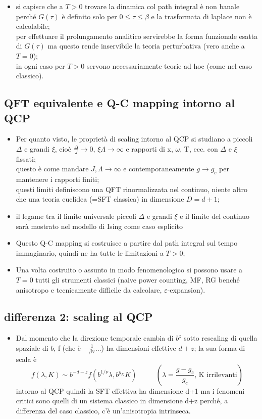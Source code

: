 \documentclass[a4paper,11pt]{article}
\newcommand{\csi}{\xi}
\newcommand{\ssubsection}[1]{\vspace{0.2cm} \subsection{#1}}
\begin{document}
\begin{itemize}
\begin{itemize}
		 \item si capisce che a $T>0$ trovare la dinamica col path integral è non banale perché $G(\tau)$ è definito solo per $0\leq \tau \leq \beta$ e la trasformata di laplace non è calcolabile; \\per effettuare il prolungamento analitico servirebbe la forma funzionale esatta di $G(\tau)$ ma questo rende inservibile la teoria perturbativa (vero anche a $T=0$); \\in ogni caso per $T>0$ servono necessariamente teorie ad hoc (come nel caso classico).
		\end{itemize}
\end{itemize}

\ssubsection{QFT equivalente e Q-C mapping intorno al QCP}
\begin{itemize}
 \item Per quanto visto, le proprietà di scaling intorno al QCP si studiano a piccoli $\Delta$ e grandi $\csi$, cioè $\frac{\Delta}{J}\to 0$, $\csi\Lambda\to\infty$ e rapporti di x, $\omega$, T, ecc. con $\Delta$ e $\csi$ fissati; \\questo è come mandare $J,\Lambda \to \infty$ e contemporaneamente $g\to g_c$ per mantenere i rapporti finiti; \\questi limiti definiscono una QFT rinormalizzata nel continuo, niente altro che una teoria euclidea (=SFT classica) in dimensione $D=d+1$;
 \item il legame tra il limite universale piccoli $\Delta$ e grandi $\csi$ e il limite del continuo sarà mostrato nel modello di Ising come caso esplicito
 \item Questo Q-C mapping si costruisce a partire dal path integral sul tempo immaginario, quindi ne ha tutte le limitazioni a $T>0$;
 \item Una volta costruito o assunto in modo fenomenologico si possono usare a $T=0$ tutti gli strumenti classici (naive power counting, MF, RG benché anisotropo e tecnicamente difficile da calcolare, $\varepsilon$-expansion).
\end{itemize}

\ssubsection{differenza 2: scaling al QCP}
\begin{itemize}
 \item Dal momento che la direzione temporale cambia di $b^z$ sotto rescaling di quella spaziale di $b$, f (che è $-\frac{1}{\beta V}\dots$) ha dimensioni effettive $d+z$; la sua forma di scala è \[f(\lambda,K) \sim b^{-d-z} f(b^{1/\nu}\lambda,b^{y_K}K)\,\,\,\,\,\,\,\,\,\,\,\,\,\,\,\,(\lambda = \frac{g-g_c}{g_c}\text{, K irrilevanti})\] intorno al QCP quindi la SFT effettiva ha dimensione d+1 ma i fenomeni critici sono quelli di un sistema classico in dimensione d+z perché, a differenza del caso classico, c'è un'anisotropia intrinseca.
\end{itemize}
\end{document}
